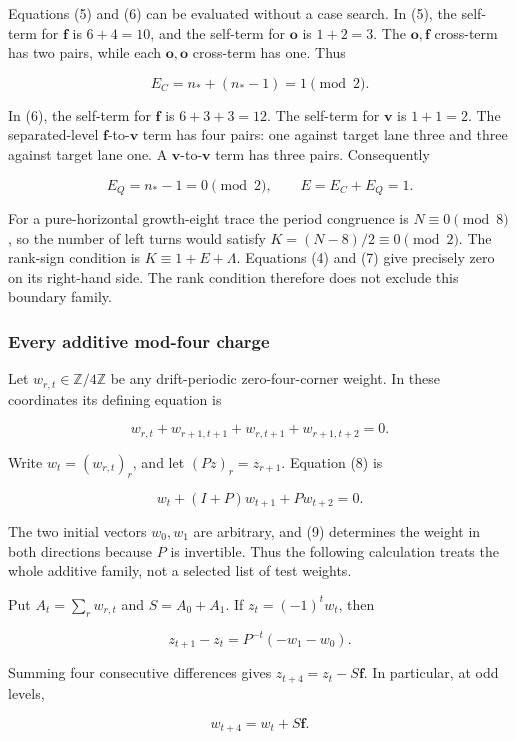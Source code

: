 \documentclass[11pt,letterpaper]{article}
\theoremstyle{plain}
\theoremstyle{definition}
\begin{document}
\begin{NoHyper}
Equations (5) and (6) can be evaluated without a case search. In (5), the self-term for \(\mathbf f\) is \(6+4=10\), and the self-term for \(\mathbf o\) is \(1+2=3\). The \(\mathbf o,\mathbf f\) cross-term has two pairs, while each \(\mathbf o,\mathbf o\) cross-term has one. Thus

\[
E_C=n_*+(n_*-1)=1\pmod2.
\]

In (6), the self-term for \(\mathbf f\) is \(6+3+3=12\). The self-term for \(\mathbf v\) is \(1+1=2\). The separated-level \(\mathbf f\)-to-\(\mathbf v\) term has four pairs: one against target lane three and three against target lane one. A \(\mathbf v\)-to-\(\mathbf v\) term has three pairs. Consequently

\[
E_Q=n_*-1=0\pmod2,
\qquad E=E_C+E_Q=1.
\tag{7}
\]

For a pure-horizontal growth-eight trace the period congruence is \(N\equiv0\pmod8\), so the number of left turns would satisfy \(K=(N-8)/2\equiv0\pmod2\). The rank-sign condition is \(K\equiv1+E+\Lambda\). Equations (4) and (7) give precisely zero on its right-hand side. The rank condition therefore does not exclude this boundary family.

\subsubsection{Every additive mod-four charge}

Let \(w_{r,t}\in\mathbb Z/4\mathbb Z\) be any drift-periodic zero-four-corner weight. In these coordinates its defining equation is

\[
w_{r,t}+w_{r+1,t+1}+w_{r,t+1}+w_{r+1,t+2}=0.
\tag{8}
\]

Write \(w_t=(w_{r,t})_r\), and let \((Pz)_r=z_{r+1}\). Equation (8) is

\[
w_t+(I+P)w_{t+1}+Pw_{t+2}=0.
\tag{9}
\]

The two initial vectors \(w_0,w_1\) are arbitrary, and (9) determines the weight in both directions because \(P\) is invertible. Thus the following calculation treats the whole additive family, not a selected list of test weights.

Put \(A_t=\sum_r w_{r,t}\) and \(S=A_0+A_1\). If \(z_t=(-1)^t w_t\), then

\[
z_{t+1}-z_t=P^{-t}(-w_1-w_0).
\]

Summing four consecutive differences gives \(z_{t+4}=z_t-S\mathbf f\). In particular, at odd levels,

\[
w_{t+4}=w_t+S\mathbf f.
\tag{10}
\]


\end{NoHyper}
\end{document}
